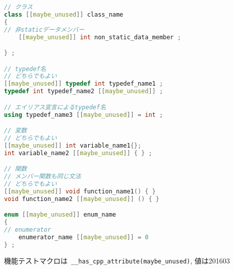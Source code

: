 \begin{lstlisting}[language=C++]
// クラス
class [[maybe_unused]] class_name
{
// 非staticデータメンバー
    [[maybe_unused]] int non_static_data_member ;

} ;

// typedef名
// どちらでもよい
[[maybe_unused]] typedef int typedef_name1 ;
typedef int typedef_name2 [[maybe_unused]] ;

// エイリアス宣言によるtypedef名
using typedef_name3 [[maybe_unused]] = int ;

// 変数
// どちらでもよい
[[maybe_unused]] int variable_name1{};
int variable_name2 [[maybe_unused]] { } ;

// 関数
// メンバー関数も同じ文法
// どちらでもよい
[[maybe_unused]] void function_name1() { }
void function_name2 [[maybe_unused]] () { }

enum [[maybe_unused]] enum_name
{
// enumerator
    enumerator_name [[maybe_unused]] = 0
} ;
\end{lstlisting}

機能テストマクロは~\lstinline!__has_cpp_attribute(maybe_unused)!,
値は201603
